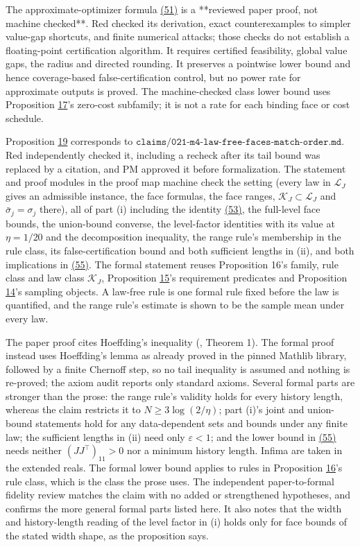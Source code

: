 \documentclass[11pt]{article}
\begin{document}
The approximate-optimizer formula \hyperref[eq:51]{(51)} is a **reviewed paper
proof, not machine checked**. Red checked its derivation,
exact counterexamples to simpler value-gap shortcuts, and
finite numerical attacks; those checks do not establish a
floating-point certification algorithm. It requires certified
feasibility, global value gaps, the radius and directed
rounding. It preserves a pointwise lower bound and hence
coverage-based false-certification control, but no power
rate for approximate outputs is proved. The machine-checked
class lower bound uses Proposition \hyperref[res:Proposition-17]{17}'s zero-cost subfamily;
it is not a rate for each binding face or cost schedule.

Proposition \hyperref[res:Proposition-19]{19} corresponds to
\(\texttt{claims/021-m4-law-free-faces-match-order.md}\). Red
independently checked it, including a recheck after its tail
bound was replaced by a citation, and PM approved it before
formalization. The statement and proof modules in the proof map
machine check the setting (every law in \(\mathcal L_J\) gives
an admissible instance, the face formulas, the face ranges,
\(\mathcal K_J\subset\mathcal L_J\) and
\(\bar\sigma_j=\sigma_j\) there), all of part (i) including the
identity \hyperref[eq:53]{(53)}, the full-level face bounds, the union-bound
converse, the level-factor identities with its value at
\(\eta=1/20\) and the decomposition inequality, the range
rule's membership in the rule class, its false-certification
bound and both sufficient lengths in (ii), and both
implications in \hyperref[eq:55]{(55)}. The formal statement reuses Proposition
16's family, rule class and law class \(\mathcal K_J\),
Proposition \hyperref[res:Proposition-15]{15}'s requirement predicates and Proposition \hyperref[res:Proposition-14]{14}'s
sampling objects. A law-free rule is one formal rule fixed
before the law is quantified, and the range rule's estimate is
shown to be the sample mean under every law.

The paper proof cites Hoeffding's inequality
(\cite{maurer2009empirical}, Theorem 1). The formal proof instead
uses Hoeffding's lemma as already proved in the pinned
Mathlib library, followed by a finite Chernoff step, so no
tail inequality is assumed and nothing is re-proved; the
axiom audit reports only standard axioms. Several formal
parts are stronger than the prose: the range rule's validity
holds for every history length, whereas the claim restricts
it to \(N\geq3\log(2/\eta)\); part (i)'s joint and
union-bound statements hold for any data-dependent sets and
bounds under any finite law; the sufficient lengths in (ii)
need only \(\varepsilon<1\); and the lower bound in \hyperref[eq:55]{(55)}
needs neither \((JJ^\top)_{11}>0\) nor a minimum history
length. Infima are taken in the extended reals. The formal
lower bound applies to rules in Proposition \hyperref[res:Proposition-16]{16}'s rule class,
which is the class the prose uses. The independent
paper-to-formal fidelity review matches the claim with no added
or strengthened hypotheses, and confirms the more general formal
parts listed here. It also notes that the width and
history-length reading of the level factor in (i) holds only
for face bounds of the stated width shape, as the proposition
says.
\end{document}
